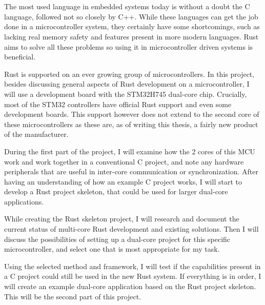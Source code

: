\chapter{\bevezetes}

The most used language in embedded systems today is without a doubt the C language, followed not so closely by C++. While these languages can get the job done in a microcontroller system, they certainly have some shortcomings, such as lacking real memory safety and features present in more modern languages. Rust aims to solve all these problems so using it in microcontroller driven systems is beneficial.

Rust is supported on an ever growing group of microcontrollers. In this project, besides discussing general aspects of Rust development on a microcontroller, I will use a development board with the STM32H745 dual-core chip. Crucially, most of the STM32 controllers have official Rust support and even some development boards. This support however does not extend to the second core of these microcontrollers as these are, as of writing this thesis, a fairly new product of the manufacturer.

During the first part of the project, I will examine how the 2 cores of this MCU work and work together in a conventional C project, and note any hardware peripherals that are useful in inter-core communication or synchronization. After having an understanding of how an example C project works, I will start to develop a Rust project skeleton, that could be used for larger dual-core applications.

While creating the Rust skeleton project, I will research and document the current status of multi-core Rust development and existing solutions. Then I will discuss the possibilities of setting up a dual-core project for this specific microcontroller, and select one that is most appropriate for my task.

Using the selected method and framework, I will test if the capabilities present in a C project could still be used in the new Rust system. If everything is in order, I will create an example dual-core application based on the Rust project skeleton. This will be the second part of this project.
